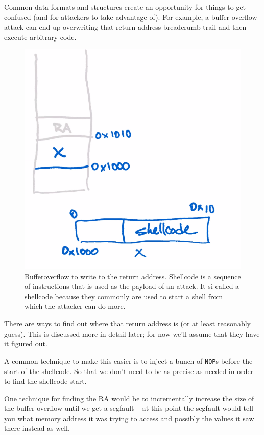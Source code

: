 \documentclass[../notes.tex]{subfiles}
\begin{document}
Common data formats and structures create an opportunity for things to get confused (and for attackers to take advantage of). 
For example, a buffer-overflow attack can end up overwriting that return address breadcrumb trail and then execute arbitrary code.

\begin{figure}[H]
    \centering
    \includegraphics[width=0.8\linewidth]{img/image_2023-01-16-18-27-59.png}
    \caption{Bufferoverflow to write to the return address. Shellcode is a sequence of instructions that is used as the payload of an attack. It si called a shellcode because they commonly are used to start a shell from which the attacker can do more.}
\end{figure}


There are ways to find out where that return address is (or at least reasonably guess).
This is discussed more in detail later; for now we'll assume that they have it figured out.


A common technique to make this easier is to inject a bunch of \texttt{NOP}s before the start of the shellcode. So that we don't need to be as precise as needed in order to find the shellcode start.

One technique for finding the RA would be to incrementally increase the size of the buffer overflow until we get a segfault -- at this point the segfault would tell you what memory address it was trying to access and possibly the values it saw there instead as well.
\end{document}
